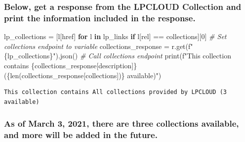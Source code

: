 \documentclass[
  letterpaper,
]{scrartcl}
\newenvironment{Shaded}{}{}
\newcommand{\BuiltInTok}[1]{#1}
\newcommand{\CommentTok}[1]{\textcolor[rgb]{0.38,0.63,0.69}{\textit{#1}}}
\newcommand{\ControlFlowTok}[1]{\textcolor[rgb]{0.00,0.44,0.13}{\textbf{#1}}}
\newcommand{\DecValTok}[1]{\textcolor[rgb]{0.25,0.63,0.44}{#1}}
\newcommand{\KeywordTok}[1]{\textcolor[rgb]{0.00,0.44,0.13}{\textbf{#1}}}
\newcommand{\NormalTok}[1]{#1}
\newcommand{\OperatorTok}[1]{\textcolor[rgb]{0.40,0.40,0.40}{#1}}
\newcommand{\SpecialCharTok}[1]{\textcolor[rgb]{0.25,0.44,0.63}{#1}}
\newcommand{\SpecialStringTok}[1]{\textcolor[rgb]{0.73,0.40,0.53}{#1}}
\newcommand{\StringTok}[1]{\textcolor[rgb]{0.25,0.44,0.63}{#1}}
\begin{document}
\hypertarget{below-get-a-response-from-the-lpcloud-collection-and-print-the-information-included-in-the-response.}{%
\subsubsection{Below, get a response from the LPCLOUD Collection and
print the information included in the
response.}\label{below-get-a-response-from-the-lpcloud-collection-and-print-the-information-included-in-the-response.}}

\begin{Shaded}
\begin{Highlighting}[]
\NormalTok{lp\_collections }\OperatorTok{=}\NormalTok{ [l[}\StringTok{\textquotesingle{}href\textquotesingle{}}\NormalTok{] }\ControlFlowTok{for}\NormalTok{ l }\KeywordTok{in}\NormalTok{ lp\_links }\ControlFlowTok{if}\NormalTok{ l[}\StringTok{\textquotesingle{}rel\textquotesingle{}}\NormalTok{] }\OperatorTok{==} \StringTok{\textquotesingle{}collections\textquotesingle{}}\NormalTok{][}\DecValTok{0}\NormalTok{]  }\CommentTok{\# Set collections endpoint to variable}
\NormalTok{collections\_response }\OperatorTok{=}\NormalTok{ r.get(}\SpecialStringTok{f"}\SpecialCharTok{\{}\NormalTok{lp\_collections}\SpecialCharTok{\}}\SpecialStringTok{"}\NormalTok{).json()                        }\CommentTok{\# Call collections endpoint}
\BuiltInTok{print}\NormalTok{(}\SpecialStringTok{f"This collection contains }\SpecialCharTok{\{}\NormalTok{collections\_response[}\StringTok{\textquotesingle{}description\textquotesingle{}}\NormalTok{]}\SpecialCharTok{\}}\SpecialStringTok{ (}\SpecialCharTok{\{}\BuiltInTok{len}\NormalTok{(collections\_response[}\StringTok{\textquotesingle{}collections\textquotesingle{}}\NormalTok{])}\SpecialCharTok{\}}\SpecialStringTok{ available)"}\NormalTok{)}
\end{Highlighting}
\end{Shaded}

\begin{verbatim}
This collection contains All collections provided by LPCLOUD (3 available)
\end{verbatim}

\hypertarget{as-of-march-3-2021-there-are-three-collections-available-and-more-will-be-added-in-the-future.}{%
\subsubsection{As of March 3, 2021, there are three collections
available, and more will be added in the
future.}\label{as-of-march-3-2021-there-are-three-collections-available-and-more-will-be-added-in-the-future.}}
\end{document}
